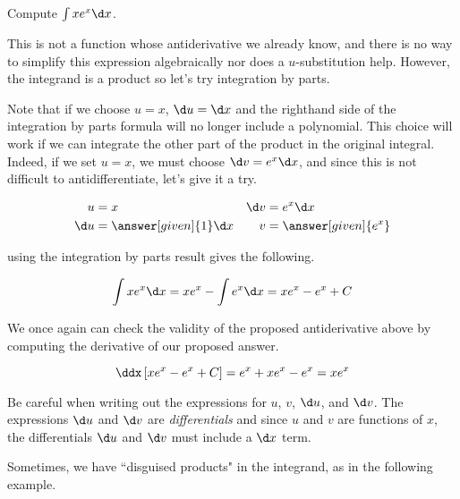 \documentclass{ximera}
\begin{document}
\begin{example}
Compute $\int xe^{x} \d x$.

\begin{explanation}
This is not a function whose antiderivative we already know, and there is no way to simplify this expression algebraically nor does a $u$-substitution help.  However, the integrand is a product so let's try integration by parts.  

Note that if we choose $u=x$, $\d u = \d x$ and the righthand side of the integration by parts formula will no longer include a polynomial.  This choice will work if we can integrate the other part of the product in the original integral.  Indeed, if we set $u=x$, we must choose $\d v=e^{x} \d x$, and since this is not difficult to antidifferentiate, let's give it a try.

\begin{align*}
u &= x & \d v & = e^x \d x \\
 \d u &= \answer[given]{1} \d x & v&= \answer[given]{e^x}
\end{align*}

using the integration by parts result gives the following.

\[
\int xe^{x} \d x= xe^{x}-\int e^{x} \d x=xe^{x}-e^{x} + C
\]

\end{explanation}

We once again can check the validity of the proposed antiderivative above by computing the derivative of our proposed answer.

\[
\ddx \left[xe^{x}-e^{x} + C\right] = e^x+xe^x -e^x = xe^x
\]

\end{example}

\begin{warning}
Be careful when writing out the expressions for $u$, $v$, $\d u$, and $\d v$.  The expressions $\d u$ and $\d v$ are \emph{differentials} and since $u$ and $v$ are functions of $x$, the differentials $\d u$ and $\d v$ must include a $\d x$ term.
\end{warning}

Sometimes, we have ``disguised products" in the integrand, as in the following example.
\end{document}
